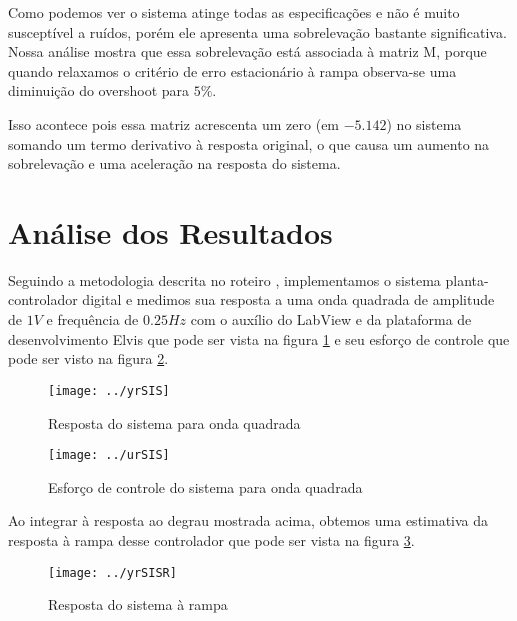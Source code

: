 \documentclass{article}
\begin{document}
Como podemos ver o sistema atinge todas as especificações e não é muito susceptível a ruídos, porém ele apresenta uma sobrelevação bastante significativa. Nossa análise mostra que essa sobrelevação está associada à matriz M, porque quando relaxamos o critério de erro estacionário à rampa observa-se uma diminuição do overshoot para $5\%$.

Isso acontece pois essa matriz acrescenta um zero (em $- 5.142$) no sistema somando um termo derivativo à resposta original, o que causa um aumento na sobrelevação e uma aceleração na resposta do sistema.

\section{Análise dos Resultados}
Seguindo a metodologia descrita no roteiro \cite{bb:roteiro}, implementamos o sistema planta-controlador digital e medimos sua resposta a uma onda quadrada de amplitude de $1V$ e frequência de $0.25Hz$ com o auxílio do LabView e da plataforma de desenvolvimento Elvis que pode ser vista na figura \ref{fig:yrSIS} e seu esforço de controle que pode ser visto na figura \ref{fig:urSIS}.

\begin{figure}[H]
	\centering
	\texttt{[image: ../yrSIS]}
	\caption{Resposta do sistema para onda quadrada}
	\label{fig:yrSIS}
\end{figure}
\begin{figure}[H]
	\centering
	\texttt{[image: ../urSIS]}
	\caption{Esforço de controle do sistema para onda quadrada}
	\label{fig:urSIS}
\end{figure}

Ao integrar à resposta ao degrau mostrada acima, obtemos uma estimativa da resposta à rampa desse controlador que pode ser vista na figura \ref{fig:yrSISR}.
\begin{figure}[H]
	\centering
	\texttt{[image: ../yrSISR]}
	\caption{Resposta do sistema à rampa}
	\label{fig:yrSISR}
\end{figure}
\end{document}
